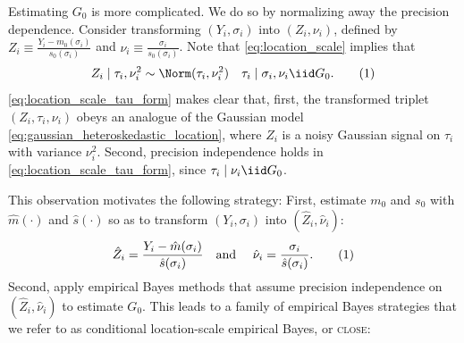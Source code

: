 \documentclass[12pt, reqno]{amsart}
\newcommand\numberthis{\addtocounter{equation}{1}\tag{\theequation}}
\newcommand{\hatm}{\hat m}
\newcommand{\hats}{\hat s}
\newcommand{\hateta}{\hat\eta}
\newcommand{\close}{\textsc{close}}
\numberwithin{equation}{section}
\begin{document}
Estimating $G_0$ is more complicated. We do so by normalizing away the precision
dependence. Consider transforming $(Y_i, \sigma_i)$ into $(Z_i, \nu_i)$, defined by
$Z_i \equiv \frac{Y_i - m_0(\sigma_i)}{s_0(\sigma_i)}$ and $\nu_i
\equiv \frac{\sigma_i}{s_0(\sigma_i)}$. Note that 
\eqref{eq:location_scale} implies that
\[
Z_i \mid \tau_i, \nu_i^2 \sim \Norm(\tau_i, \nu_i^2) \quad \tau_i \mid \sigma_i, \nu_i
\iid G_0.
\numberthis
\label{eq:location_scale_tau_form} 
\]
\eqref{eq:location_scale_tau_form} makes clear that, first, the transformed triplet $(Z_i,
 \tau_i, \nu_i)$ obeys an analogue of the Gaussian model
\eqref{eq:gaussian_heteroskedastic_location}, where $Z_i$ is a noisy Gaussian
signal on $\tau_i$ with variance $\nu_i^2$. Second, precision independence holds in
\eqref{eq:location_scale_tau_form}, since $\tau_i
\mid \nu_i \iid G_0$.

This observation motivates the following strategy: First, estimate $m_0$ and $s_0$ with
$\hatm(\cdot)$ and $\hats(\cdot)$ so as to transform $ (Y_i, \sigma_i)$
into $ (\hat Z_i,
\hat \nu_i)$: \[
\hat Z_i = \frac{Y_i - \hatm(\sigma_i)}{\hats(\sigma_i)} \quad \text {and } \quad
\hat\nu_i = \frac{\sigma_i}
 {\hats(\sigma_i)}. \numberthis \label{eq:transformed_data}\] 
Second, apply empirical Bayes methods that assume precision independence on $(\hat Z_i,
\hat\nu_i)$ to
estimate $G_0$. This leads to a family of empirical Bayes strategies that we refer to as
conditional location-scale empirical Bayes, or \close:%




\begin{center}
\begin{minipage}{0.95\textwidth}


\end{minipage}
\end{center}
\end{document}
